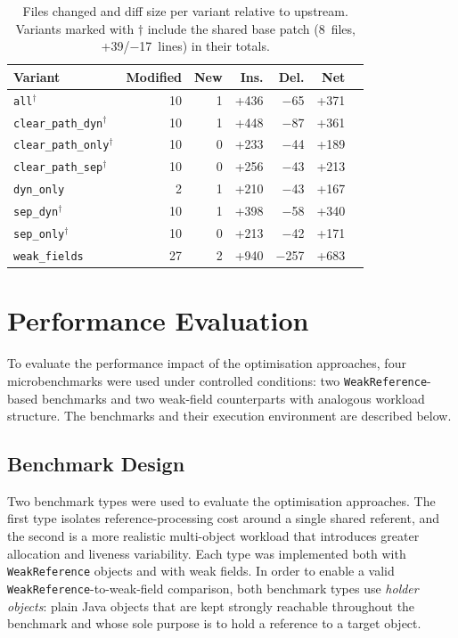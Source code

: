 \begin{table}[t]
\centering
\caption[Patch sizes per variant]{Files changed and diff size per variant relative to upstream. Variants marked with $\dagger$ include the shared base patch (8~files, +39/$-$17~lines) in their totals.}
\label{tab:patch-sizes}
\begin{tabular}{lrrrrrr}
\toprule
\textbf{Variant} & \textbf{Modified} & \textbf{New} & \textbf{Ins.} & \textbf{Del.} & \textbf{Net} \\
\midrule
\texttt{all}$^\dagger$             & 10 & 1 & +436 & $-$65  & +371 \\
\texttt{clear\_path\_dyn}$^\dagger$  & 10 & 1 & +448 & $-$87  & +361 \\
\texttt{clear\_path\_only}$^\dagger$ & 10 & 0 & +233 & $-$44  & +189 \\
\texttt{clear\_path\_sep}$^\dagger$  & 10 & 0 & +256 & $-$43  & +213 \\
\texttt{dyn\_only}        & 2  & 1 & +210 & $-$43  & +167 \\
\texttt{sep\_dyn}$^\dagger$         & 10 & 1 & +398 & $-$58  & +340 \\
\texttt{sep\_only}$^\dagger$        & 10 & 0 & +213 & $-$42  & +171 \\
\texttt{weak\_fields}     & 27 & 2 & +940 & $-$257 & +683 \\
\bottomrule
\end{tabular}
\end{table}

\section{Performance Evaluation}
\label{sec:eval-perf}

To evaluate the performance impact of the optimisation approaches, four microbenchmarks were used under controlled conditions: two \texttt{WeakReference}-based benchmarks and two weak-field counterparts with analogous workload structure. The benchmarks and their execution environment are described below.

\subsection{Benchmark Design}
\label{subsec:eval-benchmarks}

Two benchmark types were used to evaluate the optimisation approaches. The first type isolates reference-processing cost around a single shared referent, and the second is a more realistic multi-object workload that introduces greater allocation and liveness variability. Each type was implemented both with \texttt{WeakReference} objects and with weak fields. In order to enable a valid \texttt{WeakReference}-to-weak-field comparison, both benchmark types use \emph{holder objects}: plain Java objects that are kept strongly reachable throughout the benchmark and whose sole purpose is to hold a reference to a target object.

